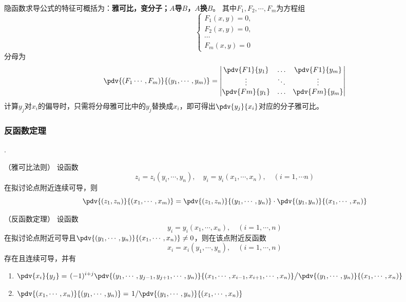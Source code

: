 隐函数求导公式的特征可概括为：\textbf{\textsf{雅可比，变分子；$A$导$B$，$A$换$B$}}。
其中$F_1,F_2,\cdots,F_m$为方程组
\[
    \begin{cases}
        F_1(x,y) = 0, \\
        F_2(x,y) = 0, \\
        \cdots        \\
        F_m(x,y) = 0
    \end{cases}
\]
分母为
\begin{equation}
    \pdv{(F_1\cdots,F_m)}{(y_1,\cdots,y_m)}
    =
    \begin{vmatrix}
        \pdv{ F1}{y_1} & \dots  & \pdv{ F1}{y_m} \\
        \vdots         & \ddots & \vdots         \\
        \pdv{ Fm}{y_1} & \dots  & \pdv{ Fm}{y_m}
    \end{vmatrix}
\end{equation}
计算$y_j$对$x_i$的偏导时，只需将分母雅可比中的$y_j$替换成$x_i$，即可得出$\displaystyle\pdv{y_j}{x_i}$对应的分子雅可比。

\subsubsection{反函数定理}
.
\begin{theorem}
    （雅可比法则）
    \label{th:雅可比法则}
    设函数
    \[ z_i = z_i(y_i,\cdots,y_n),\quad y_i=y_i(x_1,\cdots,x_n),\quad (i=1,\cdots n) \]
    在拟讨论点附近连续可导，则
    \[
        \pdv{(z_1,z_n)}{(x_1,\cdots,x_m)}
        = \pdv{(z_1,z_n)}{(y_1,\cdots,y_n)} \cdot \pdv{(y_1,y_n)}{(x_1,\cdots,x_n)}
    \]
\end{theorem}

\begin{theorem}
    （反函数定理）
    \label{th:反函数定理}
    设函数
    \[ y_i=y_i(x_1,\cdots,x_n),\quad (i=1,\cdots,n) \]
    在拟讨论点附近可导且$\displaystyle\pdv{(y_1,\cdots,y_n)}{(x_1,\cdots,x_n)}\neq 0$，则在该点附近反函数
    \[ x_i = x_i(y_1,\cdots,y_n),\quad (i=1,\cdots,n) \]
    存在且连续可导，并有
    \begin{enumerate}[(1)]
        \item
              $
                  \displaystyle
                  \pdv{x_i}{y_j}
                  = \left.(-1)^{i+j} \pdv{(y_1,\cdots,y_{j-1},y_{j+1},\cdots,y_n)}{(x_1,\cdots,x_{i-1},x_{i+1},\cdots,x_n)}
                  \middle/
                  \pdv{(y_1,\cdots,y_n)}{(x_1,\cdots,x_n)}
                  \right.
              $
        \item
              $
                  \pdv{(x_1,\cdots,x_n)}{(y_1,\cdots,y_n)} = \left.1\middle/\pdv{(y_1,\cdots,y_n)}{(x_1,\cdots,x_n)}\right.
              $
    \end{enumerate}
\end{theorem}

